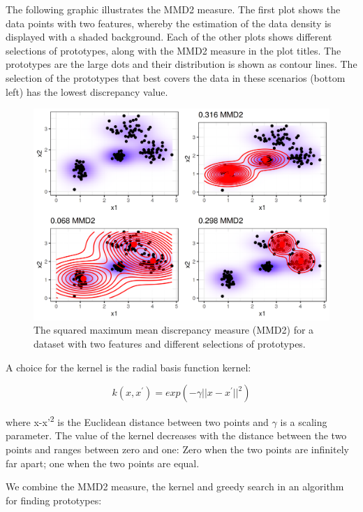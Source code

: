 \documentclass[12pt,]{krantz}
\begin{document}
The following graphic illustrates the MMD2 measure. The first plot shows
the data points with two features, whereby the estimation of the data
density is displayed with a shaded background. Each of the other plots
shows different selections of prototypes, along with the MMD2 measure in
the plot titles. The prototypes are the large dots and their
distribution is shown as contour lines. The selection of the prototypes
that best covers the data in these scenarios (bottom left) has the
lowest discrepancy value.

\begin{figure}

{\centering \includegraphics[width=\textwidth]{images/mmd-1} 

}

\caption{The squared maximum mean discrepancy measure (MMD2) for a dataset with two features and different selections of prototypes.}\label{fig:mmd}
\end{figure}

A choice for the kernel is the radial basis function kernel:

\[k(x,x^\prime)=exp\left(-\gamma||x-x^\prime||^2\right)\]

where \textbar{}\textbar{}x-x'\textbar{}\textbar{}\textsuperscript{2} is
the Euclidean distance between two points and \(\gamma\) is a scaling
parameter. The value of the kernel decreases with the distance between
the two points and ranges between zero and one: Zero when the two points
are infinitely far apart; one when the two points are equal.

We combine the MMD2 measure, the kernel and greedy search in an
algorithm for finding prototypes:
\end{document}
